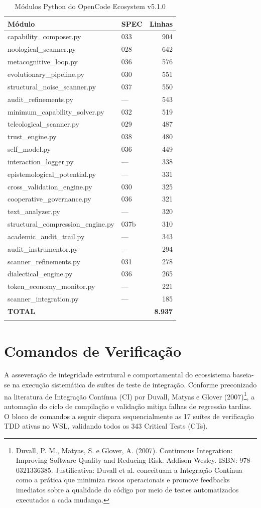 \documentclass[12pt,a4paper,oneside]{abntex2}
\begin{document}
\begin{apendicesenv}
\begin{longtable}{llr}
\toprule
\textbf{Módulo} & \textbf{SPEC} & \textbf{Linhas} \\
\midrule
capability\_composer.py & 033 & 904 \\
noological\_scanner.py & 028 & 642 \\
metacognitive\_loop.py & 036 & 576 \\
evolutionary\_pipeline.py & 030 & 551 \\
structural\_noise\_scanner.py & 037 & 550 \\
audit\_refinements.py & — & 543 \\
minimum\_capability\_solver.py & 032 & 519 \\
teleological\_scanner.py & 029 & 487 \\
trust\_engine.py & 038 & 480 \\
self\_model.py & 036 & 449 \\
interaction\_logger.py & — & 338 \\
epistemological\_potential.py & — & 331 \\
cross\_validation\_engine.py & 030 & 325 \\
cooperative\_governance.py & 036 & 321 \\
text\_analyzer.py & — & 320 \\
structural\_compression\_engine.py & 037b & 310 \\
academic\_audit\_trail.py & — & 343 \\
audit\_instrumentor.py & — & 294 \\
scanner\_refinements.py & 031 & 278 \\
dialectical\_engine.py & 036 & 265 \\
token\_economy\_monitor.py & — & 221 \\
scanner\_integration.py & — & 185 \\
\midrule
\textbf{TOTAL} & & \textbf{8.937} \\
\bottomrule
\caption{Módulos Python do OpenCode Ecosystem v5.1.0}
\end{longtable}

\chapter{Comandos de Verificação}

A asseveração de integridade estrutural e comportamental do ecossistema baseia-se na execução sistemática de suítes de teste de integração. Conforme preconizado na literatura de Integração Contínua (CI) por Duvall, Matyas e Glover (2007)\footnote{Duvall, P. M., Matyas, S. e Glover, A. (2007). Continuous Integration: Improving Software Quality and Reducing Risk. Addison-Wesley. ISBN: 978-0321336385. Justificativa: Duvall et al. conceituam a Integração Contínua como a prática que minimiza riscos operacionais e promove feedbacks imediatos sobre a qualidade do código por meio de testes automatizados executados a cada mudança.}, a automação do ciclo de compilação e validação mitiga falhas de regressão tardias. O bloco de comandos a seguir dispara sequencialmente as 17 suítes de verificação TDD ativas no WSL, validando todos os 343 Critical Tests (CTs).


\end{apendicesenv}
\end{document}

